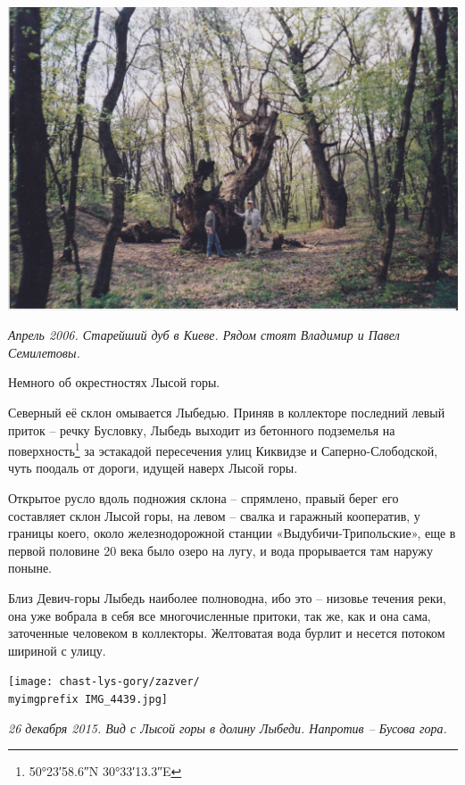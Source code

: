 \begin{center}
\includegraphics[width=\textwidth]{chast-lys-gory/zazver/stardub04.jpg}

\textit{Апрель 2006. Старейший дуб в Киеве. Рядом стоят Владимир и Павел Семилетовы.}
\end{center}

\vspace*{\fill}  

Немного об окрестностях Лысой горы. 

Северный её склон омывается Лыбедью. Приняв в коллекторе последний левый приток – речку Бусловку, Лыбедь выходит из бетонного подземелья на поверхность\footnote{50°23′58.6″N 30°33′13.3″E} за эстакадой пересечения улиц Киквидзе и Саперно-Слободской, чуть поодаль от дороги, идущей наверх Лысой горы.

Открытое русло вдоль подножия склона – спрямлено, правый берег его составляет склон Лысой горы, на левом – свалка и гаражный кооператив, у границы коего, около железнодорожной станции «Выдубичи-Трипольские», еще в первой половине 20 века было озеро на лугу, и вода прорывается там наружу поныне.

Близ Девич-горы Лыбедь наиболее полноводна, ибо это – низовье течения реки, она уже вобрала в себя все многочисленные притоки, так же, как и она сама, заточенные человеком в коллекторы. Желтоватая вода бурлит и несется потоком шириной с улицу.

\newpage

\begin{center}
\texttt{[image: chast-lys-gory/zazver/\\myimgprefix IMG\_4439.jpg]}

\textit{26 декабря 2015. Вид с Лысой горы в долину Лыбеди. Напротив – Бусова гора.}
\end{center}


